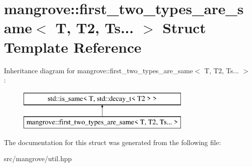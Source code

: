 \hypertarget{structmangrove_1_1first__two__types__are__same_3_01T_00_01T2_00_01Ts_8_8_8_01_4}{}\section{mangrove\+:\+:first\+\_\+two\+\_\+types\+\_\+are\+\_\+same$<$ T, T2, Ts... $>$ Struct Template Reference}
\label{structmangrove_1_1first__two__types__are__same_3_01T_00_01T2_00_01Ts_8_8_8_01_4}
Inheritance diagram for mangrove\+:\+:first\+\_\+two\+\_\+types\+\_\+are\+\_\+same$<$ T, T2, Ts... $>$\+:\begin{figure}[H]
\begin{center}
\leavevmode
\includegraphics[height=2.000000cm]{structmangrove_1_1first__two__types__are__same_3_01T_00_01T2_00_01Ts_8_8_8_01_4}
\end{center}
\end{figure}


The documentation for this struct was generated from the following file\+:\begin{DoxyCompactItemize}
\item 
src/mangrove/util.\+hpp\end{DoxyCompactItemize}
